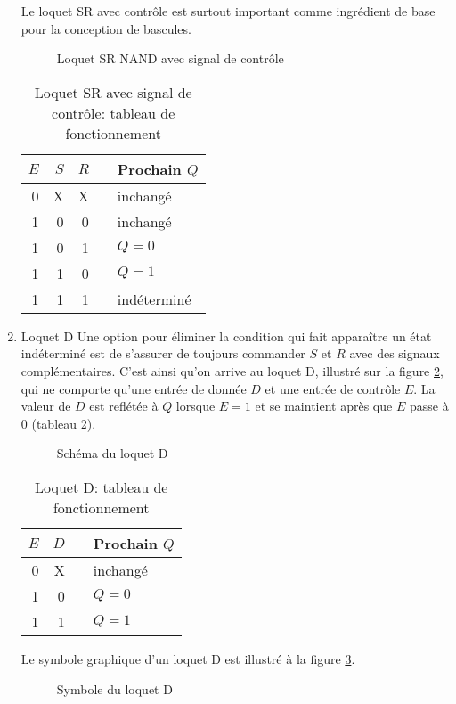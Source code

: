 \documentclass[letter, oneside]{book}
\begin{document}
\begin{enumerate}
Le loquet SR avec contrôle est surtout important comme
ingrédient de base pour la conception de bascules.

\begin{figure}[htbp]
\centering

\caption{\label{fig:org349d078}Loquet SR NAND avec signal de contrôle}
\end{figure}

\begin{table}[htbp]
\caption{\label{tab:org2eab2d0}Loquet SR avec signal de contrôle: tableau de fonctionnement}
\centering
\begin{tabular}{rrrll}
\(E\) & \(S\) & \(R\) &  & Prochain \(Q\)\\[0pt]
\hline
0 & X & X &  & inchangé\\[0pt]
1 & 0 & 0 &  & inchangé\\[0pt]
1 & 0 & 1 &  & \(Q = 0\)\\[0pt]
1 & 1 & 0 &  & \(Q = 1\)\\[0pt]
1 & 1 & 1 &  & indéterminé\\[0pt]
\end{tabular}
\end{table}

\item Loquet D
\label{sec:org5b70d8b}
Une option pour éliminer la condition qui fait apparaître un état
indéterminé est de s'assurer de toujours commander \(S\) et \(R\)
avec des signaux complémentaires. C'est ainsi qu'on arrive au loquet
D, illustré sur la figure \ref{fig:org5b44f51}, qui ne comporte qu'une entrée de
donnée \(D\) et une entrée de contrôle \(E\). La valeur de \(D\) est
reflétée à \(Q\) lorsque \(E=1\) et se maintient après que \(E\) passe
à 0 (tableau \ref{tab:org469e823}).

\begin{figure}[htbp]
\centering

\caption{\label{fig:org5b44f51}Schéma du loquet D}
\end{figure}

\begin{table}[htbp]
\caption{\label{tab:org469e823}Loquet D: tableau de fonctionnement}
\centering
\begin{tabular}{rrll}
\(E\) & \(D\) &  & Prochain \(Q\)\\[0pt]
\hline
0 & X &  & inchangé\\[0pt]
1 & 0 &  & \(Q = 0\)\\[0pt]
1 & 1 &  & \(Q = 1\)\\[0pt]
\end{tabular}
\end{table}

Le symbole graphique d'un loquet D est illustré à la figure \ref{fig:orgbb29894}.

\begin{figure}[htbp]
\centering

\caption{\label{fig:orgbb29894}Symbole du loquet D}
\end{figure}
\end{enumerate}
\end{document}
